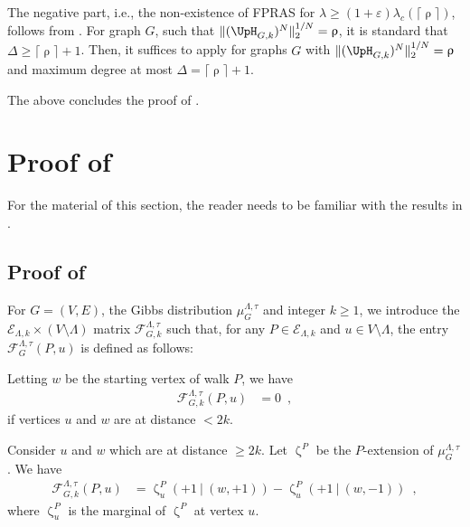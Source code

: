 \documentclass[11pt,reqno]{amsart}
\numberwithin{equation}{section}
\newcommand{\cE}{{\mathcal{E}}}
\newcommand{\cF}{{\mathcal{F}}}
\newcommand{\blue}[1]{{\color{blue}#1}}
\newcommand{\bluepigment}[1]{{\color{blue(pigment)}#1}}
\newcommand{\byzantine}[1]{{\color{byzantine}#1}}
\newcommand{\cadmiumgreen}[1]{{\color{cadmiumgreen}#1}}
\newcommand{\deeppink}[1]{{\color{deeppink}#1}}
\newcommand{\goldenbrown}[1]{{\color{goldenbrown}#1}}
\newcommand{\iris}[1]{{\color{iris}#1}}
\newcommand{\red}[1]{{\color{red}#1}}
\newcommand{\maxDeg}{{\Delta}}
\newcommand{\ExtV}{\iris{\cE}}
\newcommand{\lcritical}{{\lambda_c}}
\newcommand{\nnorm}[3]{\goldenbrown{\|} #1\goldenbrown{\|}^{#2}_{#3}}
\newcommand{\NBMatrix}{\cadmiumgreen{\UpH}_{G,\kk}}
\newcommand{\spreadpoint}{\newpage}
\newcommand{\LastReviewG}[1]{{\color{magenta}\hspace{.2cm} [Rev: \textrm{#1} - \bluepigment{G} ] \hspace{.2cm}}}
\renewcommand{\LastReviewG}[1]{}
\renewcommand{\spreadpoint}{}
\renewcommand{\blue}[1]{#1}
\renewcommand{\bluepigment}[1]{#1}
\renewcommand{\byzantine}[1]{#1}
\renewcommand{\cadmiumgreen}[1]{#1}
\renewcommand{\deeppink}[1]{#1}
\renewcommand{\goldenbrown}[1]{#1}
\renewcommand{\iris}[1]{#1}
\renewcommand{\red}[1]{#1}
\newcommand{\kk}{\bluepigment{k}}
\newcommand{\kP}{\goldenbrown{P}}
\newcommand{\ku}{\red{u}}
\newcommand{\kw}{\blue{w}}
\renewcommand{\kk}{k}
\renewcommand{\kP}{P}
\renewcommand{\ku}{u}
\renewcommand{\kw}{w}
\newcommand{\SemExtdInfMatrix}{\cF}
\newcommand{\SingBound}{\uprho}
\begin{document}

The negative part, i.e., the non-existence of FPRAS for $\lambda\geq (1+\varepsilon)\lcritical(\lceil \SingBound\rceil)$, follows 
from . For graph $G$, such that $\nnorm{ (\NBMatrix)^N}{1/N}{2}=\SingBound$, it is standard that 
$\maxDeg\geq \lceil \SingBound \rceil +1$. Then, 
it suffices to apply  for graphs $G$ with $\nnorm{ (\NBMatrix)^N}{1/N}{2}=\SingBound$ and
  maximum degree  at most $\maxDeg=\lceil \SingBound \rceil +1$.
 
 The above concludes the proof of . 

 




\spreadpoint

\newcommand{\EMTw}{\byzantine{T}}
\newcommand{\EMTPw}{\deeppink{T_{\kP}}}

\section{Proof of  \LastReviewG{2025-03-05}}

For the material of this section, the reader needs to be familiar  with the results in .

\subsection{Proof of  }\label{sec:thrm:InflVsExtInfl}
For $G=(V,E)$, the Gibbs distribution $\mu^{\Lambda,\tau}_G$ and integer $\kk\geq 1$, 
we introduce the $\ExtV_{\Lambda,\kk}\times (V\setminus \Lambda)$ matrix
 $\SemExtdInfMatrix^{\Lambda,\tau}_{G,\kk}$ such that, for any $\kP \in \ExtV_{\Lambda, \kk}$ 
 and $\ku\in V\setminus \Lambda$, the entry $\SemExtdInfMatrix^{\Lambda, \tau}_G(\kP, \ku) $ is 
 defined as follows:

Letting $\kw$ be the starting vertex of walk $\kP$, we have 
\begin{align}\label{def:EdgeInflMatrixA}
\SemExtdInfMatrix^{\Lambda, \tau}_{G,\kk}(\kP, \ku) &=0 \enspace, 
\end{align}
if vertices $\ku$ and $\kw$ are at distance $<2\kk$.


Consider $\ku$ and $\kw$ which are at distance $\geq 2\kk$. Let $\upzeta^{\kP}$ be the $\kP$-extension of $\mu^{\Lambda,\tau}_G$.
We have
%
\begin{align}\label{def:EdgeInflMatrixB}
\SemExtdInfMatrix^{\Lambda, \tau}_{G,\kk}(\kP, \ku) &=
\upzeta^{\kP}_{\ku}(+1\ |\ (\kw,+1)) - \upzeta^{\kP}_{\ku}(+1 \ |\ (\kw,-1)) \enspace, 
\end{align}
where $\upzeta^{\kP}_{\ku}$ is the marginal of $\upzeta^{\kP}$ at vertex $\ku$.
\end{document}
